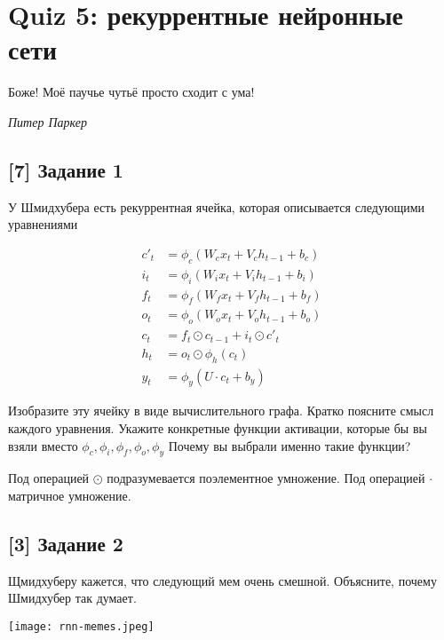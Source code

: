 \documentclass[12pt, a4paper, oneside]{article}
\begin{document}
\section*{Quiz 5: рекуррентные нейронные сети}

\epigraph{Боже! Моё паучье чутьё просто сходит с ума!}{\textit{Питер Паркер}}

\vspace{-0.5cm}
\subsection*{[7] Задание 1}
\vspace{-0.5cm}

У Шмидхубера есть рекуррентная  ячейка, которая описывается следующими уравнениями 

\begin{equation*} 
	\begin{aligned}
	c'_t &= \phi_c(W_c x_t + V_c h_{t-1} + b_c) \\
	i_t &= \phi_i(W_i x_t + V_i h_{t-1} + b_i) \\
	f_t &= \phi_f(W_f x_t + V_f h_{t-1} + b_f) \\
    o_t &= \phi_o(W_o x_t + V_o h_{t-1} + b_o) \\
    c_t &= f_t \odot c_{t-1} + i_t \odot c'_t \\
    h_t &= o_t \odot \phi_h(c_t) \\
    y_t &= \phi_y(U\cdot c_t + b_y)
	\end{aligned}
\end{equation*} 

Изобразите эту ячейку в виде вычислительного графа. Кратко поясните смысл каждого уравнения. Укажите конкретные функции активации, которые бы вы взяли вместо $\phi_c, \phi_i, \phi_f, \phi_o, \phi_y$ Почему вы выбрали именно такие функции? 

Под операцией $\odot$ подразумевается поэлементное умножение. Под операцией $\cdot$ матричное умножение.

\vspace{-0.5cm}
\subsection*{[3] Задание 2}
\vspace{-0.5cm}

Щмидхуберу кажется, что следующий мем очень смешной. Объясните, почему Шмидхубер так думает.

\begin{center} 
    \texttt{[image: rnn-memes.jpeg]} 
\end{center}
\end{document}
